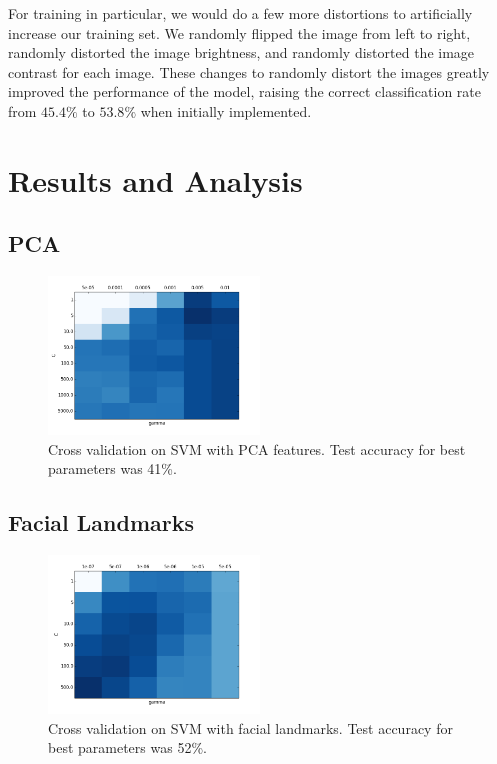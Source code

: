 \documentclass[11pt, twocolumn, twoside]{article}
\begin{document}
For training in particular, we would do a few more distortions to artificially increase our training set. We randomly flipped the image from left to right, randomly distorted the image brightness, and 	randomly distorted the image contrast for each image. These changes to randomly distort the images greatly improved the performance of the model, raising the correct classification rate from $45.4\%$ to $53.8\%$ when initially implemented.

\section{Results and Analysis}

\subsection{PCA}

\begin{figure}
\centering
\includegraphics[width=0.5\textwidth]{grid_search_pca}
\caption{\label{fig:grid_pca} Cross validation on SVM with PCA features. Test accuracy for best
parameters was 41\%.}
\end{figure}

\subsection{Facial Landmarks}

\begin{figure}
\centering
\includegraphics[width=0.5\textwidth]{grid_search_landmarks}
\caption{\label{fig:grid_pca} Cross validation on SVM with facial landmarks. Test accuracy for best
parameters was 52\%.}
\end{figure}
\end{document}
